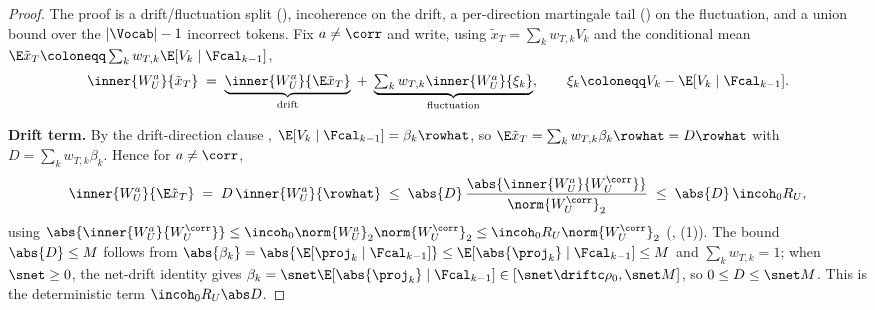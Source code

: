 \begin{proof}
The proof is a drift/fluctuation split (),
incoherence on the drift, a per-direction martingale tail
() on the fluctuation, and a union bound over the
$|\Vocab|-1$ incorrect tokens. Fix $a\neq\corr$ and write, using
$\tilde x_T=\sum_{k}w_{T,k}V_k$ and the conditional mean
$\E\tilde x_T\coloneqq\sum_k w_{T,k}\E[V_k\mid\Fcal_{k-1}]$,
\begin{align}\label{eq:incmax_split}
   \inner{W_U^a}{\tilde x_T}
   \;=\;
   \underbrace{\inner{W_U^a}{\E\tilde x_T}}_{\text{drift}}
   \;+\;
   \underbrace{\textstyle\sum_{k} w_{T,k}\inner{W_U^a}{\xi_k}}_{\text{fluctuation}},
   \qquad \xi_k\coloneqq V_k-\E[V_k\mid\Fcal_{k-1}].
\end{align}

\smallskip\noindent\textbf{Drift term.} By the drift-direction clause
, $\E[V_k\mid\Fcal_{k-1}]=\beta_k\rowhat$, so
$\E\tilde x_T=\sum_k w_{T,k}\beta_k\rowhat=D\rowhat$ with
$D=\sum_k w_{T,k}\beta_k$. Hence for $a\neq\corr$,
\begin{align*}
   \inner{W_U^a}{\E\tilde x_T}
   \;=\; D\,\inner{W_U^a}{\rowhat}
   \;\le\; \abs{D}\,\frac{\abs{\inner{W_U^a}{W_U^{\corr}}}}{\norm{W_U^{\corr}}_2}
   \;\le\; \abs{D}\,\incoh_0 R_U,
\end{align*}
using $\abs{\inner{W_U^a}{W_U^{\corr}}}\le\incoh_0\norm{W_U^a}_2\norm{W_U^{\corr}}_2\le\incoh_0 R_U\norm{W_U^{\corr}}_2$
(, (1)). The bound
$\abs{D}\le M$ follows from $\abs{\beta_k}=\abs{\E[\proj_k\mid\Fcal_{k-1}]}\le\E[\abs{\proj_k}\mid\Fcal_{k-1}]\le M$
and $\sum_k w_{T,k}=1$; when $\snet\ge0$, the net-drift identity
 gives $\beta_k=\snet\E[\abs{\proj_k}\mid\Fcal_{k-1}]\in[\snet\driftc\rho_0,\snet M]$,
so $0\le D\le\snet M$. This is the deterministic term $\incoh_0 R_U\abs D$.


\end{proof}
